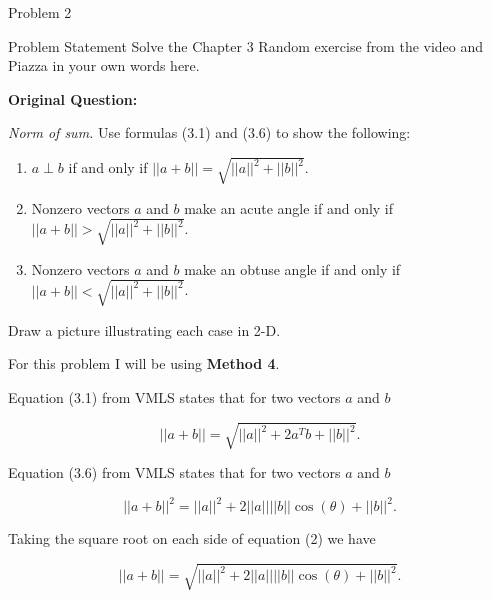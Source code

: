 \begin{problem}{Problem 2}
    \begin{statement}{Problem Statement}
        Solve the Chapter 3 Random exercise from the video and Piazza in your own words here. \vspace*{1em}

        \textbf{Original Question:} \vspace*{1em}

        \textit{Norm of sum.} Use formulas (3.1) and (3.6) to show the following:

        \begin{enumerate}[label=(\alph*)]
            \item $a \perp b$ if and only if $||a+b|| = \sqrt{||a||^{2} + ||b||^{2}}$.
            \item Nonzero vectors $a$ and $b$ make an acute angle if and only if $||a + b|| > \sqrt{||a||^{2} + ||b||^{2}}$.
            \item Nonzero vectors $a$ and $b$ make an obtuse angle if and only if $||a + b|| < \sqrt{||a||^{2} + ||b||^{2}}$.
        \end{enumerate}
        Draw a picture illustrating each case in 2-D.
    \end{statement}

    \begin{highlight}
        For this problem I will be using \textbf{Method 4}. \vspace*{1em}

        Equation (3.1) from VMLS states that for two vectors $a$ and $b$

        \setcounter{equation}{0}
        \begin{equation}
            ||a + b|| = \sqrt{||a||^{2} + 2a^{T}b + ||b||^{2}}.
        \end{equation}

        Equation (3.6) from VMLS states that for two vectors $a$ and $b$

        \begin{equation}
            ||a + b||^{2} = ||a||^{2} + 2||a||||b||\cos{(\theta)} + ||b||^2.
        \end{equation}

        Taking the square root on each side of equation (2) we have

        \begin{equation}
            ||a + b|| = \sqrt{||a||^{2} + 2||a||||b||\cos{(\theta)} + ||b||^2}.
        \end{equation}


\end{highlight}
\end{problem}
